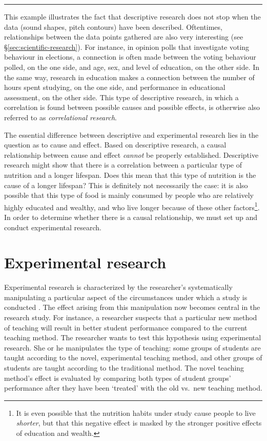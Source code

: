 \documentclass[
]{book}
\begin{document}
\begin{center}\rule{0.5\linewidth}{0.5pt}\end{center}

This example illustrates the fact that descriptive research does not stop when the data (sound shapes, pitch contours) have been described. Oftentimes, relationships between the data points gathered are also very interesting (see §\ref{sec:scientific-research}). For instance, in opinion polls that investigate voting behaviour in elections, a connection is often made between the voting behaviour polled, on the one side, and age, sex, and level of education, on the other side. In the same way, research in education makes a connection between the number of hours spent studying, on the one side, and performance in educational assessment, on the other side. This type of descriptive research, in which a correlation is found between possible causes and possible effects, is otherwise also referred to as \emph{correlational research}.

The essential difference between descriptive and experimental research lies in the question as to cause and effect. Based on descriptive research, a causal relationship between cause and effect \emph{cannot} be properly established. Descriptive research might show that there is a correlation between a particular type of nutrition and a longer lifespan. Does this mean that this type of nutrition is the cause of a longer lifespan? This is definitely not necessarily the case: it is also possible that this type of food is mainly consumed by people who are relatively highly educated and wealthy, and who live longer because of these other factors\footnote{It is even possible that the nutrition habits under study cause people to live \emph{shorter}, but that this negative effect is masked by the stronger positive effects of education and wealth.}. In order to determine whether there is a causal relationship, we must set up and conduct experimental research.

\section{Experimental research}\label{sec:experimental-research}

Experimental research is characterized by the researcher's systematically manipulating a particular aspect of the circumstances under which a study is conducted \citep{SCC02}. The effect arising from this manipulation now becomes central in the research study. For instance, a researcher suspects that a particular new method of teaching will result in better student performance compared to the current teaching method. The researcher wants to test this hypothesis using experimental research. She or he manipulates the type of teaching: some groups of students are taught according to the novel, experimental teaching method, and other groups of students are taught according to the traditional method. The novel teaching method's effect is evaluated by comparing both types of student groups' performance after they have been `treated' with the old vs.~new teaching method.
\end{document}
